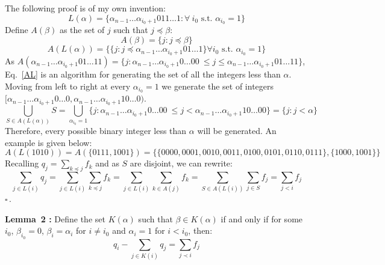 \documentclass[twoside]{article}
\begin{document}
\noindent
The following proof is of my own invention:
\begin{equation}
L(\alpha) = \{ \alpha_{n-1} \ldots \alpha_{i_0 +1} 0 11 \ldots 1: \forall \>i_0\text{ s.t. } \alpha_{i_0} = 1\}
\end{equation}
Define $A(\beta)$ as the set of $j$ such that $j \preceq \beta$:
\begin{equation}
        A(\beta) = \{j: j \preceq \beta\} 
\end{equation}
\begin{equation}
        \label{AL}
A(L(\alpha)) =  \{\{  j: j \preceq \alpha_{n-1} \ldots \alpha_{i_0+1}0 1 \ldots 1 \} \forall i_0 \text{ s.t. } \alpha_{i_0} = 1 \}
\end{equation}
As $A(\alpha_{n-1}\ldots\alpha_{i_0+1}01\ldots11) =  \{j:\alpha_{n-1}\ldots \alpha_{i_0+1} 0\ldots 00\ \leq j \leq \alpha_{n-1}\ldots \alpha_{i_0+1} 01\ldots 11\}$, Eq.~\ref{AL} is an algorithm for generating the set of all the integers less than $\alpha$. Moving from left to right at every $\alpha_{i_0}= 1$ we generate the set of integers $[\alpha_{n-1}\ldots\alpha_{i_0+1} 0\ldots0, \alpha_{n-1} \ldots \alpha_{i_0+1}10 \ldots 0)$. 
$$\bigcup_{S\in A(L(\alpha))}S = \bigcup_{\alpha_{i_0} = 1} \{j:\alpha_{n-1}\ldots \alpha_{i_0+1} 0\ldots 00\ \leq j < \alpha_{n-1}\ldots \alpha_{i_0+1} 10\ldots 00\} = \{ j: j < \alpha\}$$
Therefore, every possible binary integer less than $\alpha$ will be generated. An example is given below:
$$
A(L(1010)) = A(\{0111, 1001 \}) = \{\{0000, 0001, 0010, 0011, 0100, 0101, 0110, 0111\}, \{1000, 1001\}\}
$$
Recalling $q_j = \sum_{k \preceq j} f_k$ and as $S$ are disjoint, we can rewrite:
\begin{equation}
        \sum_{j \in L(i)} q_j = \sum_{j \in L(i)} \sum_{k \preceq j} f_k = \sum_{j \in L(i)} \sum_{k \in A(j)} f_k = \sum_{S \in A(L(i))} \sum_{j \in S} f_j = \sum_{j<i} f_j
\end{equation}
 $\square$\,.
 
\vspace*{12pt}
\noindent
{\bf Lemma~2 \cite{bravyikitaev}:} Define the set $K(\alpha)$ such that $\beta \in K(\alpha)$ if and only if for some $i_0$, $\beta_{i_0} = 0$, $\beta_i = \alpha_i$ for $i\neq i_0$ and $\alpha_i = 1$ for $i< i_0$, then:
\begin{equation}
        q_i - \sum_{j \in K(i)} q_j = \sum_{j \prec i} f_j
\end{equation}
\vspace*{12pt}
\end{document}
